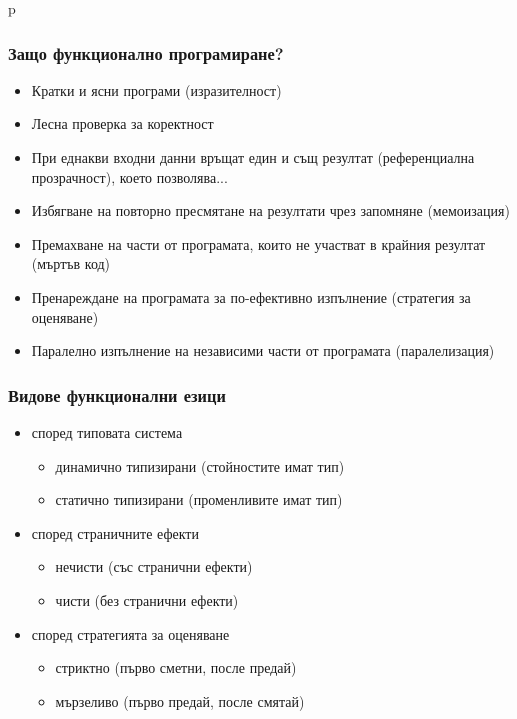 p\documentclass{beamer}
\begin{document}
\begin{frame}
  \frametitle{Защо функционално програмиране?}

  \begin{itemize}[<+->]
  \item Кратки и ясни програми (изразителност)
  \item Лесна проверка за коректност
  \item При еднакви входни данни връщат един и същ резултат (референциална прозрачност), \pause което позволява...
  \item Избягване на повторно пресмятане на резултати чрез запомняне (мемоизация)
  \item Премахване на части от програмата, които не участват в крайния резултат (мъртъв код)
  \item Пренареждане на програмата за по-ефективно изпълнение (стратегия за оценяване)
  \item Паралелно изпълнение на независими части от програмата (паралелизация)
  \end{itemize}
\end{frame}

\begin{frame}[<1-2>]
  \frametitle{Видове функционални езици}

  \begin{itemize}
  \item според типовата система
    \begin{itemize}
    \item динамично типизирани (стойностите имат тип) 
    \item статично типизирани (променливите имат тип) 
    \end{itemize}
  \item според страничните ефекти
    \begin{itemize}
    \item нечисти (със странични ефекти) 
    \item чисти (без странични ефекти) 
    \end{itemize}
  \item според стратегията за оценяване
    \begin{itemize}
    \item стриктно (първо сметни, после предай)  
    \item мързеливо (първо предай, после смятай) 
    \end{itemize}
  \end{itemize}

  \pause
\end{frame}
\end{document}
